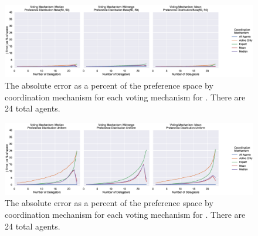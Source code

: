 \label{apx:error-by-dist-zoomed}
\begin{landscape}
    \begin{figure}[p]
        \centering
        \includegraphics[scale=0.55]
        {content/chapter2/figures/distributions/Beta(50,_50)_error_as_percent_of_space_abs_mean}
        \caption{
            The absolute error as a percent of the preference space by coordination
            mechanism for each voting mechanism for .
            There are 24 total agents.
        }
        \label{fig:beta-50-50-error-as-percent-of-space-abs-mean}
    \end{figure}
\end{landscape}

\begin{landscape}
    \begin{figure}[p]
        \centering
        \includegraphics[scale=0.55]
        {content/chapter2/figures/distributions/Uniform_error_as_percent_of_space_abs_mean}
        \caption{
            The absolute error as a percent of the preference space by coordination
            mechanism for each voting mechanism for .
            There are 24 total agents.
        }
        \label{fig:uniform-error-as-percent-of-space-abs-mean}
    \end{figure}
\end{landscape}

